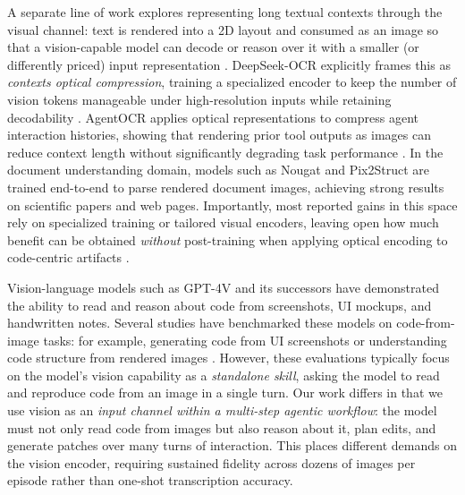 A separate line of work explores representing long textual contexts through the visual channel: text is rendered into a 2D layout and consumed as an image so that a vision-capable model can decode or reason over it with a smaller (or differently priced) input representation \cite{openai2023gpt4v_systemcard,shi2023gpt4v_ocr,kim2021donut,lee2022pix2struct}. DeepSeek-OCR explicitly frames this as \emph{contexts optical compression}, training a specialized encoder to keep the number of vision tokens manageable under high-resolution inputs while retaining decodability \cite{wei2025deepseekocr}. AgentOCR applies optical representations to compress agent interaction histories, showing that rendering prior tool outputs as images can reduce context length without significantly degrading task performance \cite{feng2026agentocr}. In the document understanding domain, models such as Nougat \cite{blecher2023nougat} and Pix2Struct \cite{lee2022pix2struct} are trained end-to-end to parse rendered document images, achieving strong results on scientific papers and web pages. Importantly, most reported gains in this space rely on specialized training or tailored visual encoders, leaving open how much benefit can be obtained \emph{without} post-training when applying optical encoding to code-centric artifacts \cite{wei2025deepseekocr,feng2026agentocr}.

Vision-language models such as GPT-4V \cite{openai2023gpt4v_systemcard} and its successors have demonstrated the ability to read and reason about code from screenshots, UI mockups, and handwritten notes. Several studies have benchmarked these models on code-from-image tasks: for example, generating code from UI screenshots \cite{si2024design2code} or understanding code structure from rendered images \cite{shi2023gpt4v_ocr}. However, these evaluations typically focus on the model's vision capability as a \emph{standalone skill}, asking the model to read and reproduce code from an image in a single turn. Our work differs in that we use vision as an \emph{input channel within a multi-step agentic workflow}: the model must not only read code from images but also reason about it, plan edits, and generate patches over many turns of interaction. This places different demands on the vision encoder, requiring sustained fidelity across dozens of images per episode rather than one-shot transcription accuracy.

